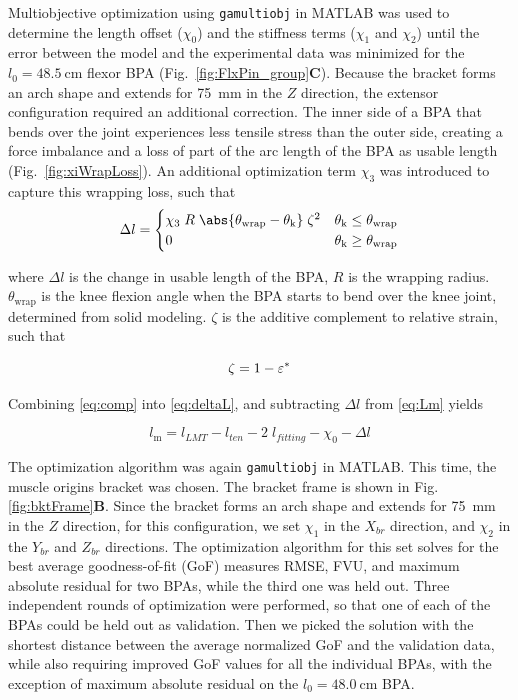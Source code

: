 Multiobjective optimization using \texttt{gamultiobj} in MATLAB was used to determine the length offset ($\chi_{0}$) and the stiffness terms ($\chi_{1}$ and $\chi_{2}$) until the error between the model and the experimental data was minimized for the $l_{0}=\qty{48.5}{\cm}$ flexor BPA (Fig.~\ref{fig:FlxPin_group}\textbf{C}). Because the bracket forms an arch shape and extends for \qty{75}{\mm} in the $Z$ direction, the extensor configuration required an additional correction. The inner side of a BPA that bends over the joint experiences less tensile stress than the outer side, creating a force imbalance and a loss of part of the arc length of the BPA as usable length (Fig.~\ref{fig:xiWrapLoss}). An additional optimization term $\chi_{3}$ was introduced to capture this wrapping loss, such that
\begin{equation}
    \Delta l = \begin{cases}
     \chi_{3}\;R\;\abs{ \theta_\text{wrap}-\theta_\text{k}}\;\zeta^2 & \theta_\text{k} \leq      \theta_\text{wrap} \\
      0 & \theta_\text{k} \geq \theta_\text{wrap}
     \end{cases}\label{eq:deltaL}
\end{equation}

where $\Delta l$ is the change in usable length of the BPA, $R$ is the wrapping radius. $\theta_\text{wrap}$ is the knee flexion angle when the BPA starts to bend over the knee joint, determined from solid modeling. $\zeta$ is the additive complement to relative strain, such that

\begin{equation}
    \zeta = 1-\varepsilon^*  \\
\label{eq:comp}
\end{equation}

Combining \eqref{eq:comp} into \eqref{eq:deltaL}, and subtracting $\Delta l$ from  \eqref{eq:Lm} yields

\begin{equation}
    l_\text{m} = l_{LMT} - l_{ten} - 2\;l_{fitting}  - \chi_{0} - \Delta l\label{eq:x3}
\end{equation}

The optimization algorithm was again \texttt{gamultiobj} in MATLAB. This time, the muscle origins bracket was chosen. The bracket frame is shown in Fig. \ref{fig:bktFrame}\textbf{B}. Since the bracket forms an arch shape and extends for \qty{75}{\mm} in the $Z$ direction, for this configuration, we set $\chi_{1}$ in the $X_{br}$ direction, and $\chi_{2}$ in the $Y_{br}$ and $Z_{br}$ directions. The optimization algorithm for this set solves for the best average goodness-of-fit (GoF) measures RMSE, FVU, and maximum absolute residual for two BPAs, while the third one was held out. Three independent rounds of optimization were performed, so that one of each of the BPAs could be held out as validation. Then we picked the solution with the shortest distance between the average normalized GoF and the validation data, while also requiring improved GoF values for all the individual BPAs, with the exception of maximum absolute residual on the $l_{0}=\qty{48.0}{\cm}$ BPA.

